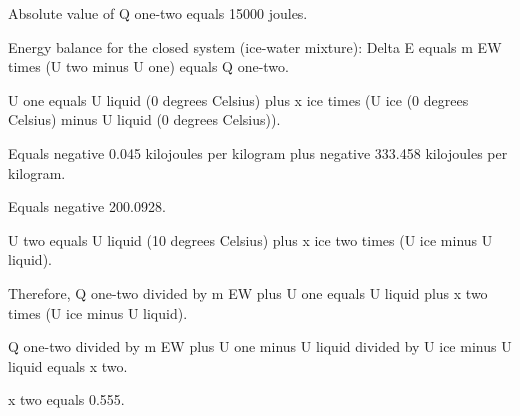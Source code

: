 Absolute value of Q one-two equals 15000 joules.  

Energy balance for the closed system (ice-water mixture):  
Delta E equals m EW times (U two minus U one) equals Q one-two.  

U one equals U liquid (0 degrees Celsius) plus x ice times (U ice (0 degrees Celsius) minus U liquid (0 degrees Celsius)).  

Equals negative 0.045 kilojoules per kilogram plus negative 333.458 kilojoules per kilogram.  

Equals negative 200.0928.  

U two equals U liquid (10 degrees Celsius) plus x ice two times (U ice minus U liquid).  

Therefore, Q one-two divided by m EW plus U one equals U liquid plus x two times (U ice minus U liquid).  

Q one-two divided by m EW plus U one minus U liquid divided by U ice minus U liquid equals x two.  

x two equals 0.555.